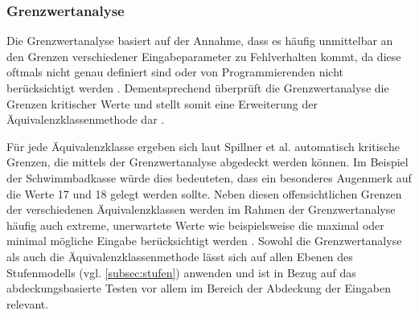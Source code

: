 \subsubsection{Grenzwertanalyse}\label{subsub:grenzwertanalyse}

Die Grenzwertanalyse basiert auf der Annahme, dass es häufig unmittelbar an den Grenzen verschiedener Eingabeparameter zu Fehlverhalten kommt, da diese oftmals nicht genau definiert sind oder von Programmierenden nicht berücksichtigt werden \cite[S. 120]{spillner2011software}. Dementsprechend überprüft die Grenzwertanalyse die Grenzen kritischer Werte und stellt somit eine Erweiterung der Äquivalenzklassenmethode dar \cite[S. 120 f.]{spillner2011software}. 

Für jede Äquivalenzklasse ergeben sich laut Spillner et al. \cite[S. 120 f.]{spillner2011software} automatisch kritische Grenzen, die mittels der Grenzwertanalyse abgedeckt werden können. Im Beispiel der Schwimmbadkasse würde dies bedeuteten, dass ein besonderes Augenmerk auf die Werte 17 und 18 gelegt werden sollte. Neben diesen offensichtlichen Grenzen der verschiedenen Äquivalenzklassen werden im Rahmen der Grenzwertanalyse häufig auch extreme, unerwartete Werte wie beispielsweise die maximal oder minimal mögliche Eingabe berücksichtigt werden \cite[S. 122]{spillner2011software}. Sowohl die Grenzwertanalyse als auch die Äquivalenzklassenmethode lässt sich auf allen Ebenen des Stufenmodells (vgl. \autoref{subsec:stufen}) anwenden und ist in Bezug auf das abdeckungsbasierte Testen vor allem im Bereich der Abdeckung der Eingaben relevant.

